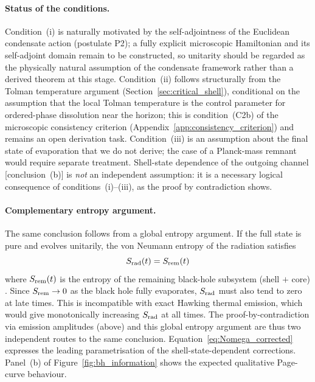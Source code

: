 \documentclass[11pt,a4paper]{article}
\numberwithin{equation}{section}
\begin{document}
\paragraph{Status of the conditions.}
Condition~(i) is naturally motivated by the self-adjointness of the Euclidean
condensate action (postulate P2); a fully explicit microscopic Hamiltonian and
its self-adjoint domain remain to be constructed, so unitarity should be
regarded as the physically natural assumption of the condensate framework
rather than a derived theorem at this stage.
Condition~(ii) follows structurally from the Tolman temperature argument
(Section~\ref{sec:critical_shell}), conditional on the assumption that the
local Tolman temperature is the control parameter for ordered-phase dissolution near
the horizon; this is condition~(C2b) of the microscopic consistency criterion
(Appendix~\ref{app:consistency_criterion}) and remains an open derivation task.
Condition~(iii) is an assumption about the final state of evaporation that we do
not derive; the case of a Planck-mass remnant would require separate treatment.
Shell-state dependence of the outgoing channel [conclusion~(b)] is
\emph{not} an independent assumption: it is a necessary logical consequence of
conditions~(i)--(iii), as the proof by contradiction shows.

\paragraph{Complementary entropy argument.}
The same conclusion follows from a global entropy argument.
If the full state is pure and evolves unitarily, the von Neumann entropy
of the radiation satisfies
\begin{equation}
S_{\rm rad}(t) = S_{\rm rem}(t)
\end{equation}
where $S_{\rm rem}(t)$ is the entropy of the remaining black-hole subsystem
(shell $+$ core) \cite{Page1993}.
Since $S_{\rm rem}\to 0$ as the black hole fully evaporates, $S_{\rm rad}$
must also tend to zero at late times.
This is incompatible with exact Hawking thermal emission, which would give
monotonically increasing $S_{\rm rad}$ at all times.
The proof-by-contradiction via emission amplitudes (above) and this global
entropy argument are thus two independent routes to the same conclusion.
Equation~\eqref{eq:Nomega_corrected} expresses the leading parametrisation
of the shell-state-dependent corrections.
Panel~(b) of Figure~\ref{fig:bh_information} shows the expected qualitative
Page-curve behaviour.
\end{document}
